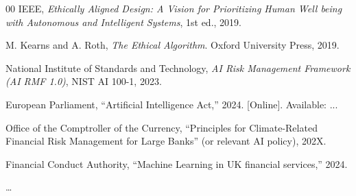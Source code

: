 \documentclass[conference]{IEEEtran}
\begin{document}
\begin{thebibliography}{00}
IEEE, \textit{Ethically Aligned Design: A Vision for Prioritizing Human Well being with Autonomous and Intelligent Systems}, 1st ed., 2019.

M. Kearns and A. Roth, \textit{The Ethical Algorithm}. Oxford University Press, 2019.

National Institute of Standards and Technology, \textit{AI Risk Management Framework (AI RMF 1.0)}, NIST AI 100-1, 2023.

European Parliament, ``Artificial Intelligence Act,'' 2024. [Online]. Available: ...

Office of the Comptroller of the Currency, ``Principles for Climate-Related Financial Risk Management for Large Banks'' (or relevant AI policy), 202X.

Financial Conduct Authority, ``Machine Learning in UK financial services,'' 2024.

\dots
\end{thebibliography}
\end{document}
